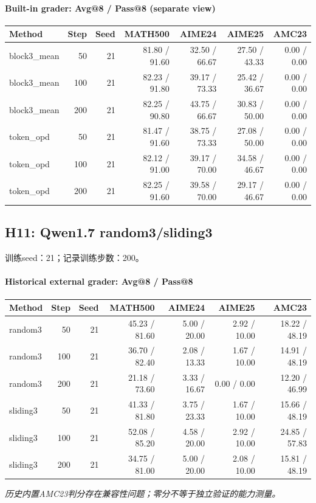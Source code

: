 \paragraph{Built-in grader: Avg@8 / Pass@8 (separate view)}
{\footnotesize\setlength{\tabcolsep}{3.5pt}
\begin{longtable}{@{}p{1.4in}rrrrrr@{}}
\toprule
Method & Step & Seed & MATH500 & AIME24 & AIME25 & AMC23 \\
\midrule\endhead
block3\_\allowbreak{}mean & 50 & 21 & 81.80 / 91.60 & 32.50 / 66.67 & 27.50 / 43.33 & 0.00 / 0.00 \\
block3\_\allowbreak{}mean & 100 & 21 & 82.23 / 91.80 & 39.17 / 73.33 & 25.42 / 36.67 & 0.00 / 0.00 \\
block3\_\allowbreak{}mean & 200 & 21 & 82.25 / 90.80 & 43.75 / 66.67 & 30.83 / 50.00 & 0.00 / 0.00 \\
token\_\allowbreak{}opd & 50 & 21 & 81.47 / 91.60 & 38.75 / 73.33 & 27.08 / 50.00 & 0.00 / 0.00 \\
token\_\allowbreak{}opd & 100 & 21 & 82.12 / 91.00 & 39.17 / 70.00 & 34.58 / 46.67 & 0.00 / 0.00 \\
token\_\allowbreak{}opd & 200 & 21 & 82.25 / 91.60 & 39.58 / 70.00 & 29.17 / 46.67 & 0.00 / 0.00 \\
\bottomrule\end{longtable}
}
\subsection{H11: Qwen1.7 random3/sliding3}
\label{history:window_random_sliding}
训练seed：21；记录训练步数：200。
\paragraph{Historical external grader: Avg@8 / Pass@8}
{\footnotesize\setlength{\tabcolsep}{3.5pt}
\begin{longtable}{@{}p{1.4in}rrrrrr@{}}
\toprule
Method & Step & Seed & MATH500 & AIME24 & AIME25 & AMC23 \\
\midrule\endhead
random3 & 50 & 21 & 45.23 / 81.60 & 5.00 / 20.00 & 2.92 / 10.00 & 18.22 / 48.19 \\
random3 & 100 & 21 & 36.70 / 82.40 & 2.08 / 13.33 & 1.67 / 10.00 & 14.91 / 48.19 \\
random3 & 200 & 21 & 21.18 / 73.60 & 3.33 / 16.67 & 0.00 / 0.00 & 12.20 / 46.99 \\
sliding3 & 50 & 21 & 41.33 / 81.80 & 3.75 / 23.33 & 1.67 / 10.00 & 15.66 / 48.19 \\
sliding3 & 100 & 21 & 52.08 / 85.20 & 4.58 / 20.00 & 2.92 / 10.00 & 24.85 / 57.83 \\
sliding3 & 200 & 21 & 34.75 / 81.00 & 5.00 / 20.00 & 2.08 / 10.00 & 15.81 / 48.19 \\
\bottomrule\end{longtable}
}
\emph{历史内置AMC23判分存在兼容性问题；零分不等于独立验证的能力测量。}
